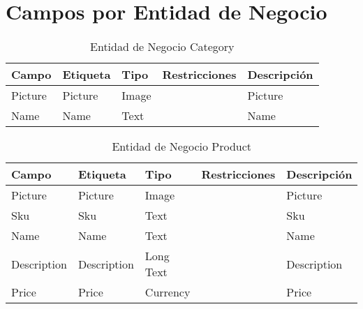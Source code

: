 \section{Campos por Entidad de Negocio} \label{sec:entity-fields-product}

\begin{table}[H]
	\caption{Entidad de Negocio Category}
	\label{tab:fields-dom-Category}
	\begin{center}
	\begin{tabularx}{0.90\linewidth}{ X X X X X }
		\hline
		\textbf{Campo} &
		\textbf{Etiqueta} &
		\textbf{Tipo} &
		\textbf{Restricciones} &
		\textbf{Descripci\'on} \\
		\hline
		Picture &
		Picture &
		Image &
		 &
		Picture \\
		Name &
		Name &
		Text &
		 &
		Name \\
		\hline
	\end{tabularx}
	\end{center}
\end{table}
\begin{table}[H]
	\caption{Entidad de Negocio Product}
	\label{tab:fields-dom-Product}
	\begin{center}
	\begin{tabularx}{0.90\linewidth}{ X X X X X }
		\hline
		\textbf{Campo} &
		\textbf{Etiqueta} &
		\textbf{Tipo} &
		\textbf{Restricciones} &
		\textbf{Descripci\'on} \\
		\hline
		Picture &
		Picture &
		Image &
		 &
		Picture \\
		Sku &
		Sku &
		Text &
		 &
		Sku \\
		Name &
		Name &
		Text &
		 &
		Name \\
		Description &
		Description &
		Long Text &
		 &
		Description \\
		Price &
		Price &
		Currency &
		 &
		Price \\
		\hline
	\end{tabularx}
	\end{center}
\end{table}

